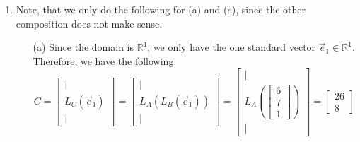 \begin{SaveQuestion}
\begin{enumerate}
        \item Note, that we only do the following for (a) and (c), since the other composition does not make sense.
        \begin{enumerate}
            \item[(a)] Since the domain is $\mathbb{R}^1$, we only have the one standard vector $\vec e_1 \in \mathbb{R}^1$. Therefore, we have the following.
            $$C = \begin{bmatrix} \vert \\ L_C(\vec e_1) \\ \vert \end{bmatrix} = \begin{bmatrix} \vert \\ L_A(L_B(\vec e_1)) \\ \vert \end{bmatrix} = \begin{bmatrix} \vert \\ L_A\left(\begin{bmatrix} 6 \\ 7\\1  \end{bmatrix}\right) \\ \vert \end{bmatrix} = \begin{bmatrix} 26 \\ 8 \end{bmatrix}$$


\end{enumerate}
\end{enumerate}
\end{SaveQuestion}

